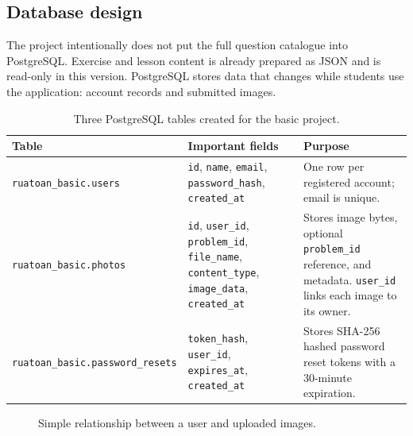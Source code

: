 \subsection{Database design}
The project intentionally does not put the full question catalogue into PostgreSQL. Exercise and lesson content is already prepared as JSON and is read-only in this version. PostgreSQL stores data that changes while students use the application: account records and submitted images.

\begin{table}[ht]
\centering\small
\begin{tabularx}{\textwidth}{@{}l l X@{}}
\toprule
\textbf{Table} & \textbf{Important fields} & \textbf{Purpose}\\
\midrule
\texttt{ruatoan\_basic.users} & \texttt{id}, \texttt{name}, \texttt{email}, \texttt{password\_hash}, \texttt{created\_at} & One row per registered account; email is unique.\\
\texttt{ruatoan\_basic.photos} & \texttt{id}, \texttt{user\_id}, \texttt{problem\_id}, \texttt{file\_name}, \texttt{content\_type}, \texttt{image\_data}, \texttt{created\_at} & Stores image bytes, optional \texttt{problem\_id} reference, and metadata. \texttt{user\_id} links each image to its owner.\\
\texttt{ruatoan\_basic.password\_resets} & \texttt{token\_hash}, \texttt{user\_id}, \texttt{expires\_at}, \texttt{created\_at} & Stores SHA-256 hashed password reset tokens with a 30-minute expiration.\\
\bottomrule
\end{tabularx}
\caption{Three PostgreSQL tables created for the basic project.}
\label{tab:basic-tables}
\end{table}

\begin{figure}[ht]
\centering
{}
\caption{Simple relationship between a user and uploaded images.}
\label{fig:basic-schema}
\end{figure}


